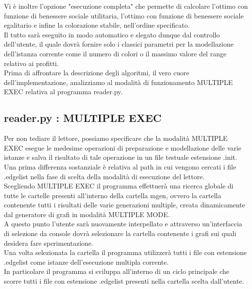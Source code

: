 Vi è inoltre l'opzione "esecuzione completa" che permette di calcolare l'ottimo con funzione di benessere sociale utilitaria, l'ottimo con funzione di benessere sociale egalitario e infine la colorazione stabile, nell'ordine specificato.\\
Il tutto sarà eseguito in modo automatico e slegato dunque dal controllo dell'utente, il quale dovrà fornire solo i classici parametri per la modellazione dell'istanza corrente come il numero di colori o il massimo valore del range relativo ai profitti.\\

Prima di affrontare la descrizione degli algoritmi, il vero cuore dell'implementazione, analizziamo al modalità di funzionamento MULTIPLE EXEC relativa al programma reader.py.\\

\subsection{reader.py : MULTIPLE EXEC}
\justify
Per non tediare il lettore, possiamo specificare che la modalità MULTIPLE EXEC esegue le medesime operazioni di preparazione e modellazione delle varie istanze e salva il risultato di tale operazione in un file testuale estensione .init.\\

Una prima differenza sostanziale è relativa al path in cui vengono cercati i file .edgelist nella fase di scelta della modalità di esecuzione del lettore.\\
Scegliendo MULTIPLE EXEC il programma effettuerà una ricerca globale di tutte le cartelle presenti all'interno della cartella mgen, ovvero la cartella contenente tutti i risultati delle varie generazioni multiple, creata dinamicamente dal generatore di grafi in modalità MULTIPLE MODE.\\

A questo punto l'utente sarà nuovamente interpellato e attraverso un'interfaccia di selezione da console dovrà selezionare la cartella contenente i grafi sui quali desidera fare sperimentazione.\\
Una volta selezionata la cartella il programma utilizzerà tutti i file con estensione .edgelist come istanze dell'esecuzione multipla corrente.\\
In particolare il programma si sviluppa all'interno di un ciclo principale che scorre tutti i file con estensione .edgelist presenti nella cartella scelta dall'utente.\\

